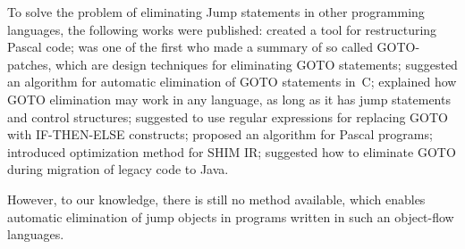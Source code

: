\documentclass[sigplan,review,11pt,nonacm,natbib=false]{acmart}
\theoremstyle{theorems}
\begin{document}
    To solve the problem of eliminating Jump statements in other programming languages, the following works were published:
     created a tool for restructuring Pascal code;
     was one of the first who made a summary of so called GOTO-patches, which are design techniques for eliminating GOTO statements;
     suggested an algorithm for automatic elimination of GOTO statements in~C;
     explained how GOTO elimination may work in any language, as long as it has jump statements and control structures;
     suggested to use regular expressions for replacing GOTO with IF-THEN-ELSE constructs;
     proposed an algorithm for Pascal programs;
     introduced optimization method for SHIM IR;
     suggested how to eliminate GOTO during migration of legacy code to Java.

    However, to our knowledge, there is still no method available, which enables automatic elimination of jump objects in programs written in such an object-flow languages.
\end{document}
